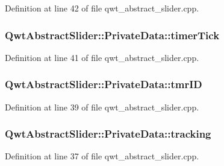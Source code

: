Definition at line 42 of file qwt\-\_\-abstract\-\_\-slider.\-cpp.

\hypertarget{class_qwt_abstract_slider_1_1_private_data_a5a6e0f585aaea765b4afcfb5cb0e17c8}{
\subsubsection[{timer\-Tick}]{ Qwt\-Abstract\-Slider\-::\-Private\-Data\-::timer\-Tick}}\label{class_qwt_abstract_slider_1_1_private_data_a5a6e0f585aaea765b4afcfb5cb0e17c8}


Definition at line 41 of file qwt\-\_\-abstract\-\_\-slider.\-cpp.

\hypertarget{class_qwt_abstract_slider_1_1_private_data_a477512995bbd0c3849108098caf367ab}{
\subsubsection[{tmr\-I\-D}]{ Qwt\-Abstract\-Slider\-::\-Private\-Data\-::tmr\-I\-D}}\label{class_qwt_abstract_slider_1_1_private_data_a477512995bbd0c3849108098caf367ab}


Definition at line 39 of file qwt\-\_\-abstract\-\_\-slider.\-cpp.

\hypertarget{class_qwt_abstract_slider_1_1_private_data_a5beb5e80a6a60359b5bf2ecf8544a50f}{
\subsubsection[{tracking}]{ Qwt\-Abstract\-Slider\-::\-Private\-Data\-::tracking}}\label{class_qwt_abstract_slider_1_1_private_data_a5beb5e80a6a60359b5bf2ecf8544a50f}


Definition at line 37 of file qwt\-\_\-abstract\-\_\-slider.\-cpp.

